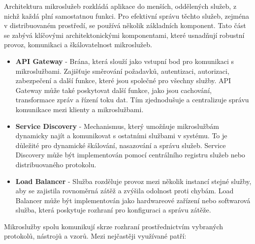 
Architektura mikroslužeb rozkládá aplikace do menších, oddělených služeb, z nichž každá plní samostatnou funkci. \cite{Williams2023} Pro efektivní správu těchto služeb, zejména v distribuovaném prostředí, se používá několik základních komponent. Tato část se zabývá klíčovými architektonickými komponentami, které usnadňují robustní provoz, komunikaci a škálovatelnost mikroslužeb. 


\begin{itemize}
    \item \textbf{API Gateway} - Brána, která slouží jako vstupní bod pro komunikaci s mikroslužbami. Zajišťuje směrování požadavků, autentizaci, autorizaci, zabezpečení a další funkce, které jsou společné pro všechny služby. API Gateway může také poskytovat další funkce, jako jsou cachování, transformace zpráv a řízení toku dat. Tím zjednodušuje a centralizuje správu komunikace mezi klienty a mikroslužbami.
    \item \textbf{Service Discovery} - Mechanismus, který umožňuje mikroslužbám dynamicky najít a komunikovat s ostatními službami v systému. To je důležité pro dynamické škálování, nasazování a správu služeb. Service Discovery může být implementován pomocí centrálního registru služeb nebo distribuovaného protokolu.
    \item \textbf{Load Balancer} - Služba rozděluje provoz mezi několik instancí stejné služby, aby se zajistila rovnoměrná zátěž a zvýšila odolnost proti chybám. Load Balancer může být implementován jako hardwareové zařízení nebo softwarová služba, která poskytuje rozhraní pro konfiguraci a správu zátěže.
\end{itemize}


Mikroslužby spolu komunikují skrze rozhraní prostřednictvím vybraných protokolů, nástrojů a vzorů. Mezi nejčastěji využívané patří:

